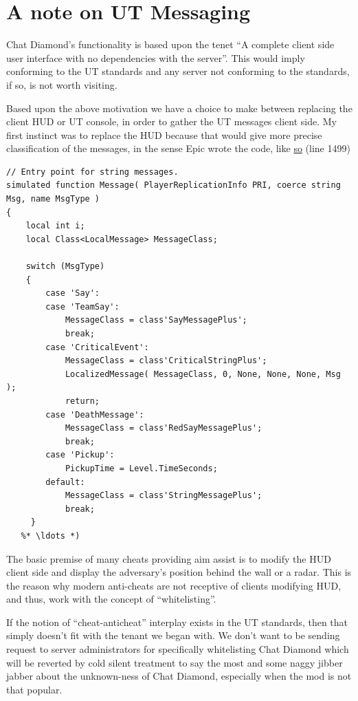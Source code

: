 \documentclass{article}
\theoremstyle{definition}
\begin{document}
\section{A note on UT Messaging}
Chat Diamond's functionality is based upon the tenet ``A complete client side user interface with no dependencies with the server''.  This would imply conforming to the UT standards and any server not conforming to the standards, if so, is not worth visiting.

Based upon the above motivation we have a choice to make between replacing the client HUD or UT console, in order to gather the UT messages client side.  My first instinct was to replace the HUD because that would give more precise classification of the messages, in the sense Epic wrote the code, like \href{http://uncodex.ut-files.com/UT/v436/Source_botpack/challengehud.html}{so} (line 1499)

\begin{lstlisting}[frame=single]
// Entry point for string messages.
simulated function Message( PlayerReplicationInfo PRI, coerce string Msg, name MsgType )
{
    local int i;
    local Class<LocalMessage> MessageClass;

    switch (MsgType)
    {
        case 'Say':
        case 'TeamSay':
            MessageClass = class'SayMessagePlus';
            break;
        case 'CriticalEvent':
            MessageClass = class'CriticalStringPlus';
            LocalizedMessage( MessageClass, 0, None, None, None, Msg );
            return;
        case 'DeathMessage':
            MessageClass = class'RedSayMessagePlus';
            break;
        case 'Pickup':
            PickupTime = Level.TimeSeconds;
        default:
            MessageClass = class'StringMessagePlus';
            break;
     }
   %* \ldots *)           
\end{lstlisting}

The basic premise of many cheats providing aim assist is to modify the HUD client side and display the adversary's position behind the wall or a radar.  This is the reason why modern anti-cheats are not receptive of clients modifying HUD, and thus, work with the concept of ``whitelisting''.

If the notion of ``cheat-anticheat'' interplay exists in the UT standards, then that simply doesn't fit with the tenant we began with.  We don't want to be sending request to server administrators for specifically whitelisting Chat Diamond which will be reverted by cold silent treatment to say the most and some naggy jibber jabber about the unknown-ness of Chat Diamond, especially when the mod is not that popular.
\end{document}
